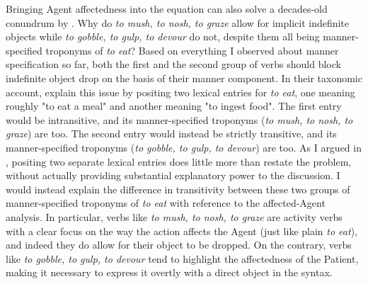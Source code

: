 Bringing Agent affectedness into the equation can also solve a decades-old conundrum by \textcite{FellbaumKegl1989taxonomic}. Why do \textit{to mush, to nosh, to graze} allow for implicit indefinite objects while \textit{to gobble, to gulp, to devour} do not, despite them all being manner-specified troponyms of \textit{to eat}? Based on everything I observed about manner specification so far, both the first and the second group of verbs should block indefinite object drop on the basis of their manner component. In their taxonomic account, \textcite{FellbaumKegl1989taxonomic} explain this issue by positing two lexical entries for \textit{to eat}, one meaning roughly "to eat a meal" and another meaning "to ingest food". The first entry would be intransitive, and its manner-specified troponyms (\textit{to mush, to nosh, to graze}) are too. The second entry would instead be strictly transitive, and its manner-specified troponyms (\textit{to gobble, to gulp, to devour}) are too. As I argued in , positing two separate lexical entries does little more than restate the problem, without actually providing substantial explanatory power to the discussion. I would instead explain the difference in transitivity between these two groups of manner-specified troponyms of \textit{to eat} with reference to the affected-Agent analysis. In particular, verbs like \textit{to mush, to nosh, to graze} are activity verbs with a clear focus on the way the action affects the Agent (just like plain \textit{to eat}), and indeed they do allow for their object to be dropped. On the contrary, verbs like \textit{to gobble, to gulp, to devour} tend to highlight the affectedness of the Patient, making it necessary to express it overtly with a direct object in the syntax.\\
